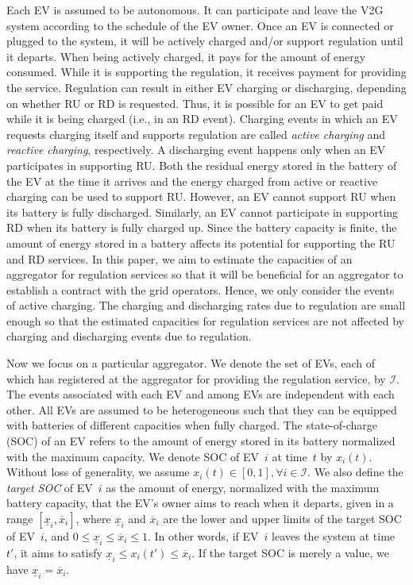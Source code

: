 \documentclass[journal]{IEEEtran}
\begin{document}
Each EV is assumed to be autonomous.  It can participate and leave the V2G
system according to the schedule of the EV owner.  Once an EV is connected or
plugged to the system, it will be actively charged and/or support regulation
until it departs.  When being actively charged, it pays for the amount of energy
consumed.  While it is supporting the regulation, it receives payment for
providing the service.  Regulation can result in either EV charging or
discharging, depending on whether RU or RD is requested.  
Thus, it is possible for an EV to get paid while it is being charged (i.e., in an
RD event). Charging events in which an EV requests
charging itself and supports regulation are called \textit{active charging} and
\textit{reactive charging}, respectively.  
A discharging event happens only
when an EV participates in supporting RU.  Both the residual energy
stored in the battery of the EV at the time it arrives and the energy charged
from active or reactive charging can be used to support RU.  However,
an EV cannot support RU when its battery is fully discharged.
Similarly, an EV cannot participate in supporting RD when its
battery is fully charged up.  Since the battery capacity is finite, the amount
of energy stored in a battery affects its potential for supporting the
RU and RD services.  In this paper, we aim to estimate
the capacities of an aggregator for regulation services so that it will be
beneficial for an aggregator to establish a contract with the grid operators.
Hence, we only consider the events of active charging.  The charging and
discharging rates due to regulation are small enough so that the estimated
capacities for regulation services are not affected by charging and discharging
events due to regulation.

Now we focus on a particular aggregator.  We denote the set of EVs, each of
which has registered at the aggregator for providing the regulation service, by
$\mathcal{I}$.  The events associated with each EV and among EVs are
independent with each other.  
All EVs are assumed to be heterogeneous such that
they can be equipped with batteries of different capacities when fully charged.  
The state-of-charge (SOC) of an EV refers to the amount of energy stored in its
battery normalized with the maximum capacity.  We denote SOC of EV~$i$ at
time~$t$ by $x_i(t)$.  Without loss of generality, we assume
$x_i(t) \in [0,1], \forall i\in \mathcal{I}$.  We also define the
\textit{target SOC} of EV~$i$ as the amount of energy, normalized with the
maximum battery capacity, that the EV's owner aims to reach when it departs,
given in a range $[\underline{x}_i, \overline{x}_i]$, where $\underline{x}_i$
and $\overline{x}_i$ are the lower and upper limits of the target SOC of
EV~$i$, and $0\leq \underline{x}_i \leq \overline{x}_i \leq 1$.  In other
words, if EV~$i$ leaves the system at time~$t'$, it aims to satisfy
$\underline{x}_i \leq x_i(t') \leq \overline{x}_i$.  If the target SOC is
merely a value, we have $\underline{x}_i = \overline{x}_i$. 
 
\end{document}
